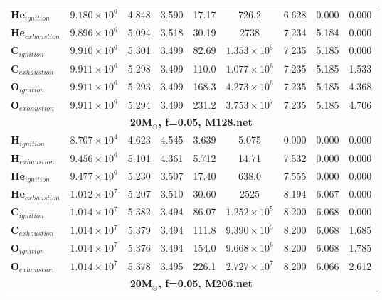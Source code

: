 \begin{table}[h]
\begin{tabular}{lcccccccc}
        \textbf{He$_{ignition}$} & $9.180 \times 10^6$  & 4.848 & 3.590 & 17.17  & 726.2    & 6.628  & 0.000  & 0.000  \\
        \textbf{He$_{exhaustion}$} & $9.896 \times 10^6$  & 5.094 & 3.518 & 30.19 & 2738  & 7.234  & 5.184  & 0.000  \\
        \textbf{C$_{ignition}$} & $9.910 \times 10^6$  & 5.301 & 3.499 & 82.69  & $1.353 \times 10^5$    & 7.235  & 5.185  & 0.000  \\
        \textbf{C$_{exhaustion}$} & $9.911 \times 10^6$  & 5.298 & 3.499 & 110.0  & $1.077 \times 10^6$    & 7.235  & 5.185  & 1.533  \\
        \textbf{O$_{ignition}$} & $9.911 \times 10^6$  & 5.293 & 3.499 & 168.3  & $4.273 \times 10^6$    & 7.235  & 5.185  & 4.368  \\
        \textbf{O$_{exhaustion}$} & $9.911 \times 10^6$  & 5.294 & 3.499 & 231.2  & $3.753 \times 10^7$ & 7.235  & 5.185  & 4.706  \\
        \midrule
        \multicolumn{9}{c}{\textbf{20M$_\odot$, f=0.05, M128.net}} \\
        \midrule
	\textbf{H$_{ignition}$} & $8.707 \times 10^4$  & 4.623 & 4.545 & 3.639  & 5.075  & 0.000  & 0.000  & 0.000  \\
        \textbf{H$_{exhaustion}$} & $9.456 \times 10^6$  & 5.101 & 4.361 & 5.712  & 14.71 & 7.532  & 0.000  & 0.000  \\
        \textbf{He$_{ignition}$} & $9.477 \times 10^6$  & 5.230 & 3.507 & 17.40  & 638.0 & 7.555  & 0.000  & 0.000  \\
        \textbf{He$_{exhaustion}$} & $1.012 \times 10^7$  & 5.207 & 3.510 & 30.60 & 2525 & 8.194  & 6.067  & 0.000  \\
        \textbf{C$_{ignition}$} & $1.014 \times 10^7$  & 5.382 & 3.494 & 86.07  & $1.252 \times 10^5$ & 8.200  & 6.068  & 0.000  \\
        \textbf{C$_{exhaustion}$} & $1.014 \times 10^7$  & 5.379 & 3.494 & 111.8  & $9.390 \times 10^5$ & 8.200  & 6.068  & 1.685  \\
        \textbf{O$_{ignition}$} & $1.014 \times 10^7$  & 5.376 & 3.494 & 154.0  & $9.668 \times 10^6$ & 8.200  & 6.068  & 1.785  \\
        \textbf{O$_{exhaustion}$} & $1.014 \times 10^7$  & 5.378 & 3.495 & 226.1  & $2.727 \times 10^7$ & 8.200  & 6.066  & 2.612  \\
        \midrule
        \multicolumn{9}{c}{\textbf{20M$_\odot$, f=0.05, M206.net}} \\

\end{tabular}
\end{table}
